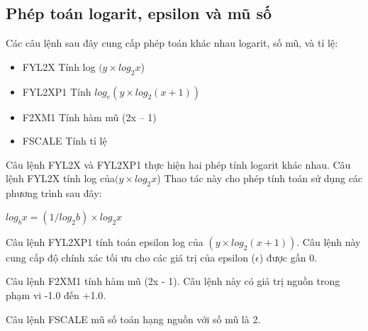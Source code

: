 		\subsection*{Phép toán logarit, epsilon và mũ số}
		Các câu lệnh sau đây cung cấp phép toán khác nhau logarit, số mũ, và tỉ lệ:
		\begin{itemize}
			\renewcommand{\labelitemi}{}
			\item		FYL2X Tính log $(y \times log_{2}x$)
			\item		FYL2XP1 Tính $ log_{e} (y \times log_{2}(x + 1))$
			\item		F2XM1 Tính hàm mũ  (2x – 1)
			\item		FSCALE Tính tỉ lệ
		\end{itemize}

	Câu lệnh FYL2X và FYL2XP1 thực hiện hai phép tính logarit khác nhau. Câu lệnh FYL2X tính log của$ (y \times log_{2}x$) Thao tác này cho phép tính toán sử dụng các phương trình sau đây:
	
	
		$log_{b}x = (1 / log_{2}b) \times log_{2} x$
		
		
		Câu lệnh FYL2XP1 tính toán epsilon log của $(y \times  log_{2}(x + 1))$. Câu lệnh này cung cấp độ chính xác tối ưu cho các giá trị của epsilon ($\epsilon$) được gần 0.
		
		
		Câu lệnh F2XM1 tính hàm mũ (2x - 1). Câu lệnh này có giá trị nguồn trong phạm vi -1.0 đến +1.0.
		
		
		
		Câu lệnh FSCALE mũ số toán hạng nguồn với số mũ là 2.
		
